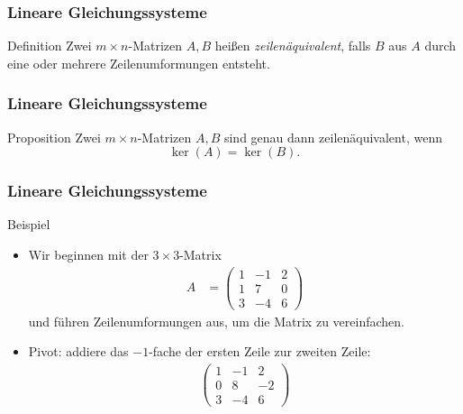 \documentclass{beamer}
\renewcommand{\emph}[1]{{\textcolor{solarizedRed}{\itshape #1}}}
\renewcommand{\ae}{\"a}
\newcommand{\ue}{\"u}
\newcommand{\mytitle}{Lineare Gleichungssysteme}
\begin{document}
\begin{frame}\frametitle{\mytitle}
	\begin{block}{Definition}
		Zwei $m\times n$-Matrizen $A,B$ hei\ss en \emph{zeilen\ae quivalent}, falls $B$ aus $A$ durch eine oder mehrere Zeilenumformungen entsteht.
	\end{block}
\end{frame}

\begin{frame}\frametitle{\mytitle}
	\begin{block}{Proposition}
		Zwei $m\times n$-Matrizen $A,B$ sind genau dann zeilen\ae quivalent, wenn $$\ker(A)=\ker(B).$$
	\end{block}
\end{frame}

\begin{frame}\frametitle{\mytitle}
	\begin{block}{Beispiel}
	\begin{itemize}
	\item Wir beginnen mit der $3\times 3$-Matrix 
		\begin{align*}
			A&=\begin{pmatrix}1&-1&2\\1&7&0\\3&-4&6\end{pmatrix}
		\end{align*}
		und f\ue hren Zeilenumformungen aus, um die Matrix zu vereinfachen.
	\item \alert{Pivot:} addiere das $-1$-fache der ersten Zeile zur zweiten Zeile:
\begin{align*}
		\begin{pmatrix}
1&-1&2\\0&8&-2\\3&-4&6
		\end{pmatrix}
		\end{align*}
	\end{itemize}
	\end{block}
\end{frame}
\end{document}
